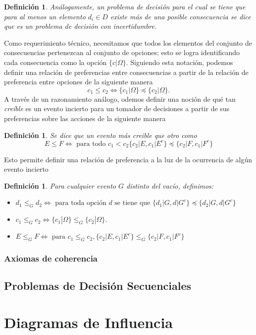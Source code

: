 \documentclass[11pt]{article}
\theoremstyle{plain}
\newtheorem{defi}[teo]{Definición}
\begin{document}
\begin{defi}
Análogamente, un problema de decisión para el cual se tiene que para al menos un elemento $d_i \in D$ existe más de una posible consecuencia se dice que es un problema de decisión con incertidumbre.
\end{defi}
Como requerimiento técnico, necesitamos que todos los elementos del conjunto de consecuencias pertenezcan al conjunto de opciones; esto se logra identificando cada consecuencia como la opción $\{c|\Omega \}$. Siguiendo esta notación, podemos definir una relación de preferencias entre consecuencias a partir de la relación de preferencia entre opciones de la siguiente manera
\[ c_1 \leq c_2 \Leftrightarrow \{ c_1 | \Omega \} \preceq \{ c_2 | \Omega \}.\]
A través de un razonamiento análogo, odemos definir una noción de qué tan \textit{creíble} es un evento incierto para un tomador de decisiones a partir de sus preferencias sobre las acciones de la siguiente manera
\begin{defi}
Se dice que un evento más creible que otro como
\[E \leq F \Leftrightarrow \textrm{ para todo } c_1 < c_2 \{ c_2 | E, c_1 | E^c \} \preceq \{ c_2 | F, c_1 | F^c \} \]
\end{defi}
Esto permite definir una relación de preferencia a la luz de la ocurrencia de algún evento incierto
\begin{defi}
Para cualquier evento $G$ distinto del vacío, definimos:
\begin{itemize}
\item $d_1 \leq_G d_2 \Leftrightarrow \textrm{ para toda opción } d \textrm{ se tiene que } \{d_1 | G, d | G^c \} \preceq \{ d_2 | G, d | G^c\}$
\item $c_1 \leq_G c_2 \Leftrightarrow \{ c_1 | \Omega \} \leq_G \{ c_2 | \Omega \}$.
\item $E \leq_G F \Leftrightarrow \textrm{ para } c_1 \leq_G c_2, \{ c_2 | E, c_1 | E^c \} \leq_G \{ c_2 | F, c_1 | F^c \} $
\end{itemize}
\end{defi}
\subsubsection{Axiomas de coherencia}

\subsection{Problemas de Decisión Secuenciales}
\section{Diagramas de Influencia}
\end{document}

